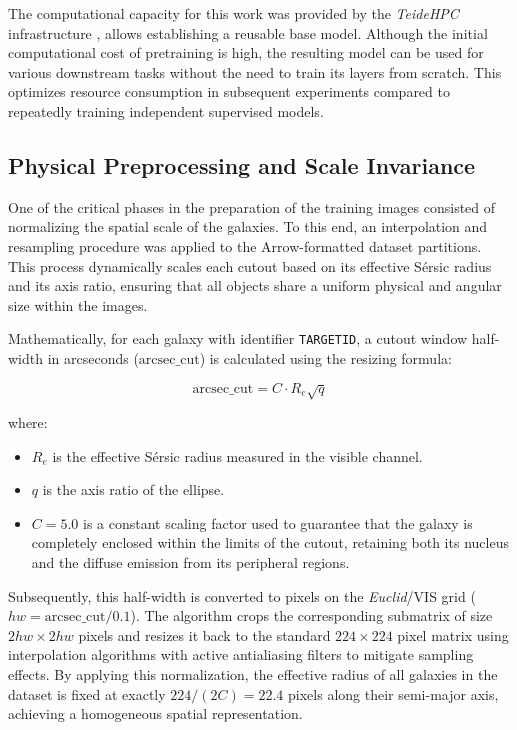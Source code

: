 The computational capacity for this work was provided by the \textit{TeideHPC} infrastructure \autocite{ar:teidehpc}, allows establishing a reusable base model. Although the initial computational cost of pretraining is high, the resulting model can be used for various downstream tasks without the need to train its layers from scratch. This optimizes resource consumption in subsequent experiments compared to repeatedly training independent supervised models.

\subsection{Physical Preprocessing and Scale Invariance}

One of the critical phases in the preparation of the training images consisted of normalizing the spatial scale of the galaxies. To this end, an interpolation and resampling procedure was applied to the Arrow-formatted dataset partitions. This process dynamically scales each cutout based on its effective Sérsic radius and its axis ratio, ensuring that all objects share a uniform physical and angular size within the images.

Mathematically, for each galaxy with identifier \texttt{TARGETID}, a cutout window half-width in arcseconds ($\text{arcsec\_cut}$) is calculated using the resizing formula:

\begin{equation}
\text{arcsec\_cut} = C \cdot R_e \sqrt{q}
\label{eq:arcsec_cut}
\end{equation}

where:

\begin{itemize}
\item $R_e$ is the effective Sérsic radius measured in the visible channel.
\item $q$ is the axis ratio of the ellipse.
\item $C = 5.0$ is a constant scaling factor used to guarantee that the galaxy is completely enclosed within the limits of the cutout, retaining both its nucleus and the diffuse emission from its peripheral regions.
\end{itemize}

Subsequently, this half-width is converted to pixels on the \textit{Euclid}/VIS grid ($hw = \text{arcsec\_cut} / 0.1$). The algorithm crops the corresponding submatrix of size $2hw \times 2hw$ pixels and resizes it back to the standard $224 \times 224$ pixel matrix using interpolation algorithms with active antialiasing filters to mitigate sampling effects. By applying this normalization, the effective radius of all galaxies in the dataset is fixed at exactly $224 / \left(2 C\right) = 22.4$ pixels along their semi-major axis, achieving a homogeneous spatial representation.

